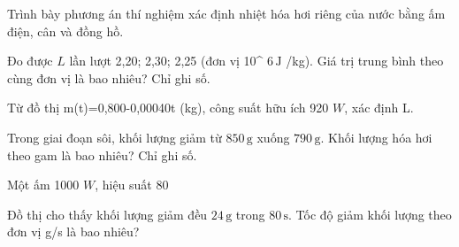 \begin{bt}
Trình bày phương án thí nghiệm xác định nhiệt hóa hơi riêng của nước bằng ấm điện, cân và đồng hồ.
\end{bt}

\begin{ex}
Đo được $L$ lần lượt 2,20; 2,30; 2,25 (đơn vị 10^ $6\,\text{J}$ /kg). Giá trị trung bình theo cùng đơn vị là bao nhiêu? Chỉ ghi số.
\end{ex}

\begin{bt}
Từ đồ thị m(t)=0,800-0,00040t (kg), công suất hữu ích 920 $W$, xác định L.
\end{bt}

\begin{ex}
Trong giai đoạn sôi, khối lượng giảm từ $850\,\text{g}$ xuống $790\,\text{g}$. Khối lượng hóa hơi theo gam là bao nhiêu? Chỉ ghi số.
\end{ex}

\begin{bt}
Một ấm 1000 $W$, hiệu suất 80%
\end{bt}

\begin{ex}Đồ thị cho thấy khối lượng giảm đều $24\,\text{g}$ trong $80\,\text{s}$. Tốc độ giảm khối lượng theo đơn vị g/s là bao nhiêu?
\end{ex}

